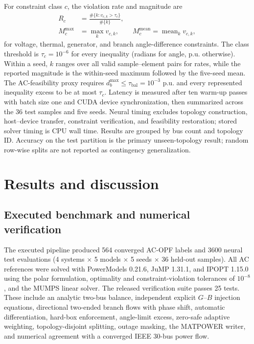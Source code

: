 \documentclass[final,5p,times,twocolumn]{elsarticle}
\newcommand{\mean}{\operatorname{mean}}
\begin{document}
For constraint class $c$, the violation rate and magnitude are
\begin{align}
  R_c
  &=
  \frac{\#\{k:v_{c,k}>\tau_c\}}{\#\{k\}},
  \label{eq:violation_rate}\\
  M_c^{\max}
  &=
  \max_k v_{c,k},
  \qquad
  M_c^{\mathrm{mean}}
  =
  \mean_k v_{c,k},
  \label{eq:violation_magnitude}
\end{align}
for voltage, thermal, generator, and branch angle-difference constraints. The
class threshold is $\tau_c=10^{-6}$ for every inequality (radians for angle,
p.u. otherwise). Within a seed, $k$ ranges over all valid sample--element pairs
for rates, while the reported magnitude is the within-seed maximum followed by
the five-seed mean. The AC-feasibility proxy requires
$d_b^{\max}\leq\tau_{\mathrm{bal}}=10^{-3}$ p.u. and every represented
inequality excess to be at most $\tau_c$.
Latency is measured after ten warm-up passes with batch size one and CUDA
device synchronization, then summarized across the 36 test samples and five
seeds. Neural timing excludes topology construction, host--device transfer,
constraint verification, and feasibility restoration; stored solver timing is
CPU wall time. Results are grouped by bus count and topology ID. Accuracy on
the test partition is the primary unseen-topology result; random row-wise
splits are not reported as contingency generalization.

\section{Results and discussion}
\label{sec:results}

\subsection{Executed benchmark and numerical verification}

The executed pipeline produced 564 converged AC-OPF labels and 3600 neural
test evaluations (4 systems $\times$ 5 models $\times$ 5 seeds $\times$ 36
held-out samples). All AC references were solved with PowerModels 0.21.6,
JuMP 1.31.1, and IPOPT 1.15.0 using the polar formulation, optimality and
constraint-violation tolerances of $10^{-8}$, and the MUMPS linear solver. The
released verification suite passes 25 tests. These include an analytic two-bus
balance, independent explicit $G$--$B$ injection equations, directional
two-ended branch flows with phase shift, automatic differentiation, hard-box
enforcement, angle-limit excess, zero-safe adaptive weighting,
topology-disjoint splitting, outage masking, the MATPOWER writer, and numerical
agreement with a converged IEEE 30-bus power flow.
\end{document}

